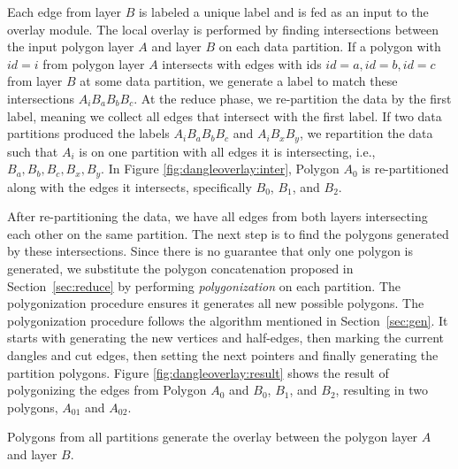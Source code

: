Each edge from layer $B$ is labeled a unique label and is fed as an input to the overlay module.
The local overlay is performed by finding intersections between the input polygon layer $A$ and layer $B$ on each data partition.
If a polygon with $id = i$ from polygon layer $A$ intersects with edges with ids $id = a, id = b, id = c$ from layer $B$ at some data partition, we generate a 
label to match these intersections $A_{i} B_{a} B_{b} B_{c}$. 
At the reduce phase, we re-partition the data by the first label, meaning we collect all edges that intersect with the first label.
If two data partitions produced the labels $A_{i} B_{a} B_{b} B_{c}$ and $A_{i} B_{x} B_{y}$, we repartition the data such that $A_{i}$ is on one partition with 
all edges it is intersecting, i.e., $B_{a}, B_{b}, B_{c}, B_{x}, B_{y}$.
In Figure \ref{fig:dangleoverlay:inter}, Polygon $A_0$ is re-partitioned along with the edges it intersects, specifically $B_0$, $B_1$, and $B_2$.

After re-partitioning the data, we have all edges from both layers intersecting each other on the same partition. The next step is to find the polygons 
generated by these intersections. Since there is no guarantee that only one polygon is generated, we substitute the polygon concatenation proposed in 
Section~\ref{sec:reduce} by performing \textit{polygonization} on each partition. The polygonization procedure ensures it generates all new possible polygons. 
The polygonization procedure follows the algorithm mentioned in Section~\ref{sec:gen}. It starts with generating the new vertices and half-edges, then marking 
the current dangles and cut edges, then setting the next pointers and finally generating the partition polygons.
Figure \ref{fig:dangleoverlay:result} shows the result of polygonizing the edges from Polygon $A_0$ and $B_0$, $B_1$, and $B_2$, resulting in two polygons, 
$A_01$ and $A_02$.

Polygons from all partitions generate the overlay between the polygon layer $A$ and layer $B$.
